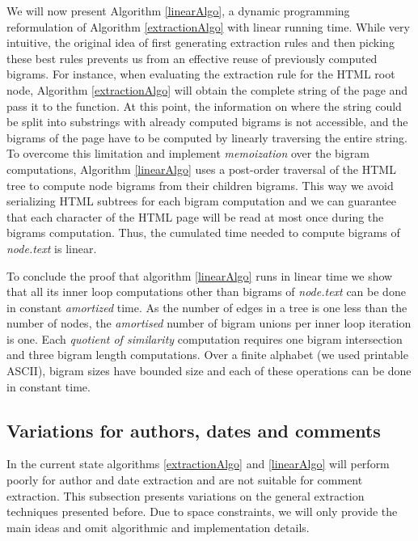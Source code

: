 We will now present Algorithm \ref{linearAlgo}, a dynamic programming reformulation of Algorithm \ref{extractionAlgo} with linear running time. While very intuitive, the original idea of first generating extraction rules and then picking these best rules prevents us from an effective reuse of previously computed bigrams. For instance, when evaluating the extraction rule for the HTML root node, Algorithm \ref{extractionAlgo} will obtain the complete string of the page and pass it to the  function. At this point, the information on where the string could be split into substrings with already computed bigrams is not accessible, and the bigrams of the page have to be computed by linearly traversing the entire string. To overcome this limitation and implement \emph{memoization} over the bigram computations, Algorithm \ref{linearAlgo} uses a post-order traversal of the HTML tree to compute node bigrams from their children bigrams. This way we avoid serializing HTML subtrees for each bigram computation and we can guarantee that each character of the HTML page will be read at most once during the bigrams computation. Thus, the cumulated time needed to compute bigrams of \emph{node.text} is linear.

\linearAlgo

To conclude the proof that algorithm \ref{linearAlgo} runs in linear time we show that all its inner loop computations other than bigrams of \emph{node.text} can be done in constant \emph{amortized} time. As the number of edges in a tree is one less than the number of nodes, the \emph{amortised} number of bigram unions per inner loop iteration is one. Each \emph{quotient of similarity} computation requires one bigram intersection and three bigram length computations. Over a finite alphabet (we used printable ASCII), bigram sizes have bounded size and each of these operations can be done in constant time.


\subsection{Variations for authors, dates and comments}
\label{variationsforauthorsdatesandcomments}

In the current state algorithms \ref{extractionAlgo} and \ref{linearAlgo} will perform poorly for author and date extraction and are not suitable for comment extraction. This subsection presents variations on the general extraction
\label{presentsvariationsonthegeneralextraction}techniques presented before. Due to space constraints, we will only provide the main ideas and omit algorithmic and implementation details.

